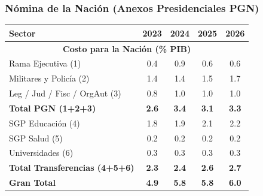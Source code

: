 \begin{frame}
  \frametitle{Nómina de la Nación \small{(Anexos Presidenciales PGN)}}
  \begin{center}
    \begin{tabular}{lcccc}
        \hline
        \textbf{Sector} & \textbf{2023} & \textbf{2024} & \textbf{2025} & \textbf{2026} \\
        \hline
        \multicolumn{5}{c}{\textbf{Costo para la Nación (\% PIB)}} \\
        \hline
        Rama Ejecutiva (1) & 0.4 & 0.9 & 0.6 & 0.6 \\
        Militares y Policía (2) & 1.4 & 1.4 & 1.5 & 1.7 \\
        Leg / Jud / Fisc /  OrgAut (3) & 0.8 & 1.0 & 1.0 & 1.0 \\
        \textbf{Total PGN (1+2+3)} & \textbf{2.6} & \textbf{3.4} & \textbf{3.1} & \textbf{3.3} \\
        \hline
        SGP Educación (4) & 1.8 & 1.9 & 2.1 & 2.2 \\ 
        SGP Salud (5) & 0.2 & 0.2 & 0.2 & 0.2 \\
        Universidades (6) & 0.3 & 0.3 & 0.3 & 0.3 \\
        \textbf{Total Transferencias (4+5+6)}  & \textbf{2.3} & \textbf{2.4} & \textbf{2.6} & \textbf{2.7} \\
        \hline
        \textbf{Gran Total} & \textbf{4.9} & \textbf{5.8} & \textbf{5.8} & \textbf{6.0} \\
        \hline
    \end{tabular}
  \end{center}
\end{frame}
